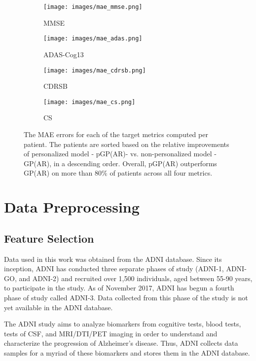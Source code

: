 \documentclass{article}
\begin{document}
\begin{figure}
\centering
    \begin{subfigure}{.45\textwidth}
        \centering
        \texttt{[image: images/mae\_mmse.png]}
        \caption{MMSE}\label{fig:fig_a}
    \end{subfigure} %
    \begin{subfigure}{.45\textwidth}
        \centering
        \texttt{[image: images/mae\_adas.png]}
        \caption{ADAS-Cog13}\label{fig:fig_b}
    \end{subfigure} %
    \begin{subfigure}{.45\textwidth}
        \centering
        \texttt{[image: images/mae\_cdrsb.png]}
        \caption{CDRSB}\label{fig:fig_c}
    \end{subfigure}
    \begin{subfigure}{.45\textwidth}
        \centering
        \texttt{[image: images/mae\_cs.png]}
        \caption{CS}\label{fig:fig_c}
    \end{subfigure}
\caption{The MAE errors for each of the target metrics computed per patient. The patients are sorted based on the relative improvements of personalized model - pGP(AR)- vs. non-personalized model - GP(AR), in a descending order. Overall, pGP(AR) outperforms GP(AR) on more than $80\%$ of patients across all four metrics.}
\label{fig:ind_per}
\end{figure}


\section{Data Preprocessing}
\subsection{Feature Selection}
Data used in this work was obtained from the ADNI database. Since its inception, ADNI has conducted three separate phases of study (ADNI-1, ADNI-GO, and ADNI-2) and recruited over 1,500 individuals, aged between 55-90 years, to participate in the study. As of November 2017, ADNI has begun a fourth phase of study called ADNI-3. Data collected from this phase of the study is not yet available in the ADNI database. 

The ADNI study aims to analyze biomarkers from cognitive tests, blood tests, tests of CSF, and MRI/DTI/PET imaging in order to understand and characterize the progression of Alzheimer’s disease. Thus, ADNI collects data samples for a myriad of these biomarkers and stores them in the ADNI database. 
\end{document}
